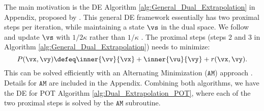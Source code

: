 The main motivation is the DE Algorithm \ref{alg:General_Dual_Extrapolation} in Appendix, proposed by \citep{nesterov_2006}. This general DE framework essentially has two proximal steps per iteration, while maintaining a state $\vs$ in the dual space.
We follow \citep{Jambulapati-2019-Direct} and update $\vs$ with $1/2 \kappa$ rather than $1/ \kappa$ \citep{nesterov_2006}. The proximal steps (steps 2 and 3 in Algorithm \ref{alg:General_Dual_Extrapolation}) needs to minimize: 
\begin{equation} \label{General_AM}
    P(\vx, \vy) \defeq \inner{\vv}{\vx} + \inner{\vu}{\vy} + r(\vx,\vy).
\end{equation}
This can be solved efficiently with an Alternating Minimization ($\mathtt{AM}$) approach \citep{Jambulapati-2019-Direct}. Details for $\mathtt{AM}$ are included in the Appendix.  
Combining both algorithms, we have the DE for POT Algorithm \ref{alg:Dual_Extrapolation_POT}, where each of the two proximal steps is solved by the $\mathtt{AM}$ subroutine.

